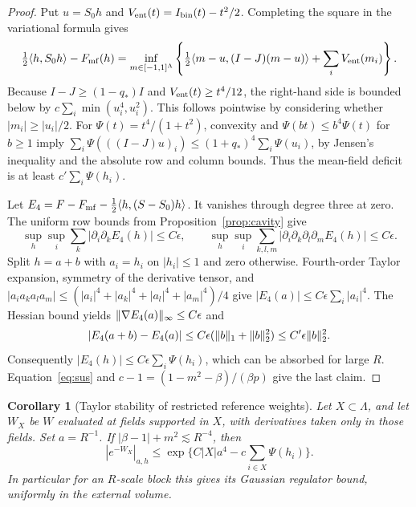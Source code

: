 \documentclass[11pt]{article}
\newtheorem{corollary}[proposition]{Corollary}
\DeclarePairedDelimiter{\norm}{\lVert}{\rVert}
\begin{document}
\begin{proof}
Put \(u=S_0h\) and \(V_{\rm ent}(t)=I_{\rm bin}(t)-t^2/2\). Completing
the square in the variational formula gives
\[
 \tfrac12\langle h,S_0h\rangle-F_{\rm mf}(h)
 =\inf_{m\in[-1,1]^\Lambda}
  \left\{\tfrac12\langle m-u,(I-J)(m-u)\rangle
                     +\sum_i V_{\rm ent}(m_i)\right\}.
\]
Because \(I-J\ge(1-q_*)I\) and \(V_{\rm ent}(t)\ge t^4/12\),
the right-hand side is bounded below by
\(c\sum_i\min(u_i^4,u_i^2)\). This follows pointwise by considering
whether \(|m_i|\ge |u_i|/2\). For
\(\Psi(t)=t^4/(1+t^2)\), convexity and
\(\Psi(bt)\le b^4\Psi(t)\) for \(b\ge1\) imply
\(\sum_i\Psi(((I-J)u)_i)\le (1+q_*)^4\sum_i\Psi(u_i)\), by
Jensen's inequality and the absolute row and column bounds. Thus
the mean-field deficit is at least \(c'\sum_i\Psi(h_i)\).

Let \(E_4=F-F_{\rm mf}-\frac12\langle h,(S-S_0)h\rangle\).
It vanishes through degree three at zero. The uniform row bounds
from Proposition~\ref{prop:cavity} give
\[
 \sup_h\sup_i\sum_k|\partial_i\partial_kE_4(h)|\le C\epsilon,
 \qquad
 \sup_h\sup_i\sum_{k,l,m}|\partial_i\partial_k\partial_l\partial_m
 E_4(h)|\le C\epsilon.
\]
Split \(h=a+b\) with \(a_i=h_i\) on \(|h_i|\le1\) and zero otherwise.
Fourth-order Taylor expansion, symmetry of the derivative tensor, and
\(|a_i a_k a_l a_m|\le(|a_i|^4+|a_k|^4+|a_l|^4+|a_m|^4)/4\)
give \(|E_4(a)|\le C\epsilon\sum_i|a_i|^4\).
The Hessian bound yields
\(\norm{\nabla E_4(a)}_\infty\le C\epsilon\) and
\[
 |E_4(a+b)-E_4(a)|\le C\epsilon(\norm b_1+\norm b_2^2)
                    \le C'\epsilon\norm b_2^2.
\]
Consequently \(|E_4(h)|\le C\epsilon\sum_i\Psi(h_i)\), which
can be absorbed for large \(R\). Equation~\eqref{eq:sus} and
\(c-1=(1-m^2-\beta)/(\beta p)\) give the last claim.
\end{proof}


\begin{corollary}[Taylor stability of restricted reference weights]\label{cor:stablerestr}
Let \(X\subset\Lambda\), and let \(W_X\) be \(W\) evaluated at fields
supported in \(X\), with derivatives taken only in those fields.
Set \(a=R^{-1}\). If \(|\beta-1|+m^2\lesssim R^{-4}\), then
\[
 |e^{-W_X}|_{a,h}
 \le \exp\{C|X|a^4-c\textstyle\sum_{i\in X}\Psi(h_i)\}.
\]
In particular for an \(R\)-scale block this gives its Gaussian
regulator bound, uniformly in the external volume.
\end{corollary}
\end{document}
